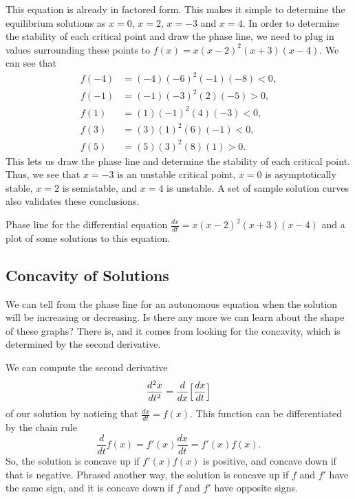 \documentclass{ximera}
\begin{document}
\begin{exampleSol}
    This equation is already in factored form. This makes it simple to determine the equilibrium solutions as $x=0$, $x=2$, $x=-3$ and $x=4$. In order to determine the stability of each critical point and draw the phase line, we need to plug in values surrounding these points to $f(x) = x(x-2)^2(x+3)(x-4)$. We can see that
    \begin{equation*}
        \begin{split}
        f(-4) &= (-4)(-6)^2(-1)(-8) < 0, \\
        f(-1) &= (-1)(-3)^2(2)(-5) > 0, \\
        f(1) &= (1)(-1)^2(4)(-3) < 0, \\
        f(3) &= (3)(1)^2(6)(-1) < 0, \\
        f(5) &= (5)(3)^2(8)(1) > 0.
        \end{split}
    \end{equation*}
    This lets us draw the phase line and determine the stability of each critical point. Thus, we see that $x=-3$ is an unstable critical point, $x=0$ is asymptotically stable, $x=2$ is semistable, and $x=4$ is unstable. A set of sample solution curves also validates these conclusions.


    \begin{myfig}
        \capstart
        \caption{Phase line for the differential equation $\frac{dx}{dt} = x(x-2)^2(x+3)(x-4)$ and a plot of some solutions to this equation.\label{autoexsolplot:fig}}
    \end{myfig}
\end{exampleSol}

\subsection{Concavity of Solutions}

We can tell from the phase line for an autonomous equation when the solution will be increasing or decreasing. Is there any more we can learn about the shape of these graphs? There is, and it comes from looking for the concavity, which is determined by the second derivative.

We can compute the second derivative 
\begin{equation*}
    \frac{d^2x}{dt^2} = \frac{d}{dx} \Bigl[ \frac{dx}{dt} \Bigr]
\end{equation*}
of our solution by noticing that $\frac{dx}{dt} = f(x)$. This function can be differentiated by the chain rule
\begin{equation*}
    \frac{d}{dt} f(x) = f'(x) \frac{dx}{dt} = f'(x) f(x).
\end{equation*}
So, the solution is concave up if $f'(x)f(x)$ is positive, and concave down if that is negative. Phrased another way, the solution is concave up if $f$ and $f'$ have the same sign, and it is concave down if $f$ and $f'$ have opposite signs. 
\end{document}
